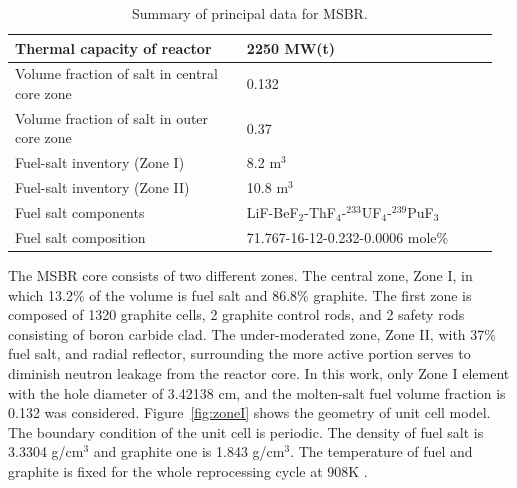 \documentclass{anstrans}
\begin{document}
\captionsetup[table]{
        labelsep = newline,
        name = TABLE, justification=justified,
        singlelinecheck=false,%
        labelsep=colon,%
skip = \medskipamount}
\begin{table}[h!]
        \begin{tabular}{p{0.46\linewidth} p{0.50\linewidth}} \toprule
                Thermal capacity of reactor           & 2250 MW(t)
                \\ \midrule
                Volume fraction of salt in central core zone     & 0.132
                \\ \midrule
                Volume fraction of salt in outer core zone       & 0.37
                \\ \midrule
                Fuel-salt inventory (Zone I)                  & 8.2 m$^3$	
                \\ \midrule
                Fuel-salt inventory (Zone II)                 & 10.8 m$^3$	
                \\ \midrule
                Fuel salt components                  & 
                LiF-BeF$_2$-ThF$_4$-$^{233}$UF$_4$-$^{239}$PuF$_3$	\\ 
                \midrule
                Fuel salt composition                 & 
                71.767-16-12-0.232-0.0006 mole\%
                \\
                \bottomrule
        \end{tabular}
        \caption{Summary of principal data for MSBR.}
        \label{tab:data}
\end{table}

The \gls{MSBR} core consists of two different zones. The central 
zone, Zone I, in which 13.2\% of the volume is fuel salt and 86.8\% graphite. 
The first zone is composed of 1320 graphite cells, 2 graphite control rods, and 
2 safety rods consisting of boron carbide clad. The under-moderated zone, Zone 
II, with 37\% fuel salt, and radial reflector, surrounding the more active 
portion serves to diminish neutron leakage from the reactor core. In this work, 
only Zone I element with the hole diameter of 3.42138 cm, and the molten-salt 
fuel volume fraction is 0.132 was considered. Figure~\ref{fig:zoneI} shows the 
geometry of unit cell model. The boundary condition of the unit cell is 
periodic. The density of fuel salt is 3.3304 g/cm$^3$ and graphite one is 1.843 
g/cm$^3$. The temperature of fuel and graphite is fixed for the whole 
reprocessing cycle at 908K \cite{robertson_conceptual_1971}.
\end{document}
